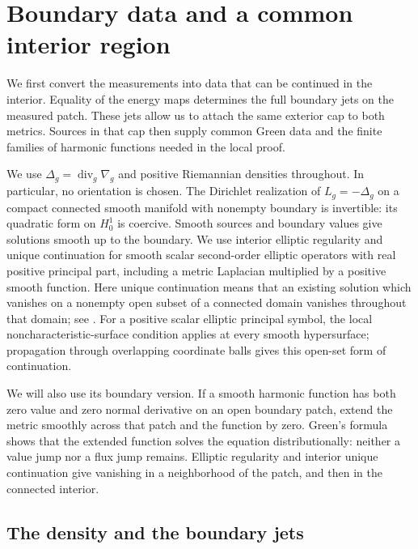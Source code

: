 \section{Boundary data and a common interior region}
\label{data:section}

We first convert the measurements into data that can be continued in the
interior. Equality of the energy maps determines the full boundary jets
on the measured patch. These jets allow us to attach the same exterior
cap to both metrics. Sources in that cap then supply common Green data
and the finite families of harmonic functions needed in the local proof.

We use $\Delta_g=\operatorname{div}_g\nabla_g$ and positive Riemannian
densities throughout. In particular, no orientation is chosen.
The Dirichlet realization of $L_g=-\Delta_g$ on a compact connected
smooth manifold with nonempty boundary is invertible: its quadratic
form on $H^1_0$ is coercive. Smooth sources and boundary values give
solutions smooth up to the boundary. We use interior elliptic
regularity and unique continuation for smooth scalar second-order
elliptic operators with real positive principal part, including a
metric Laplacian multiplied by a positive smooth function.
Here unique continuation means that an existing
solution which vanishes on a nonempty open subset of a connected
domain vanishes throughout that domain; see
\citep[Theorem~8]{KochTataru2005}.
For a positive scalar elliptic principal symbol, the local
noncharacteristic-surface condition applies at every smooth
hypersurface; propagation through overlapping coordinate balls gives
this open-set form of continuation.

We will also use its boundary version. If a smooth harmonic function
has both zero value and zero normal derivative on an open boundary
patch, extend the metric smoothly across that patch and the function
by zero. Green's formula shows that the extended function solves the
equation distributionally: neither a value jump nor a flux jump
remains. Elliptic regularity and interior unique continuation give
vanishing in a neighborhood of the patch, and then in the connected
interior.

\subsection{The density and the boundary jets}

